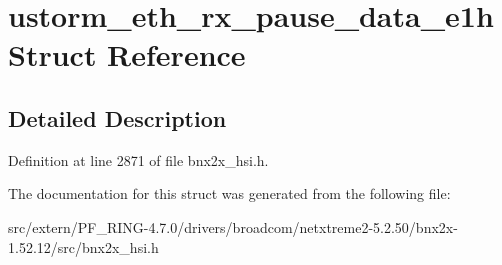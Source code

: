 \hypertarget{structustorm__eth__rx__pause__data__e1h}{
\section{ustorm\_\-eth\_\-rx\_\-pause\_\-data\_\-e1h Struct Reference}
\label{structustorm__eth__rx__pause__data__e1h}
}


\subsection{Detailed Description}


Definition at line 2871 of file bnx2x\_\-hsi.h.



The documentation for this struct was generated from the following file:\begin{DoxyCompactItemize}
\item 
src/extern/PF\_\-RING-\/4.7.0/drivers/broadcom/netxtreme2-\/5.2.50/bnx2x-\/1.52.12/src/bnx2x\_\-hsi.h\end{DoxyCompactItemize}
